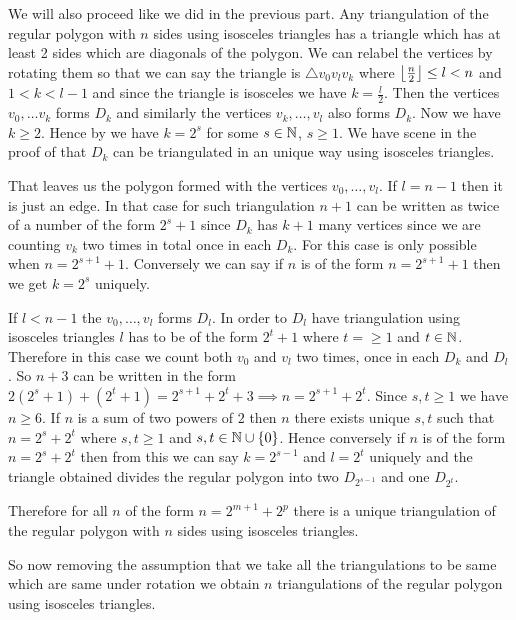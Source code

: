 \documentclass[a4paper, 11pt]{article}
\begin{document}
{\begin{itemize}[label=$\bullet$]
\begin{itemize}
We will also proceed like we did in the previous part. Any triangulation of the regular polygon with $n$ sides using isosceles triangles has a triangle which has at least 2 sides which are diagonals of the polygon. We can relabel the vertices by rotating them so that we can say the triangle is $\triangle v_0v_lv_k$ where $\left\lfloor\frac{n}2\right\rfloor\leq l<n$ and $1<k<l-1$ and since the triangle is isosceles we have $k=\frac{l}2$. Then the vertices $v_0,\dots  v_k$ forms $D_{k}$ and similarly the vertices  $v_k,\dots, v_l$ also forms $D_k$. Now we have $k\geq 2$. Hence by  we have $k=2^s$ for some $s\in\mathbb{N}$, $s\geq 1$. We have scene in the proof of  that $D_k$ can be triangulated in an unique way using isosceles triangles.  

That leaves us the polygon formed with the vertices $v_0,\dots, v_l$. If $l=n-1$ then it is just an edge. In that case for such triangulation $n+1$ can be written as twice of a number of the form $2^s+1$ since $D_k$ has $k+1$ many vertices since we are counting $v_k$ two times in total once in each $D_k$. For this case is only possible when $n=2^{s+1}+1$. Conversely we can say if $n$ is of the form $n=2^{s+1}+1$ then we get $k=2^s$ uniquely. 

If $l<n-1$ the $v_0,\dots, v_l$ forms $D_l$. In order to $D_l$ have triangulation using isosceles triangles $l$ has to be of the form $2^t+1$ where $t=\geq 1$ and $t\in\mathbb{N}$. Therefore in this case we count both $v_0$ and $v_l$ two times, once in each $D_k$ and $D_l$. So $n+3$ can be written in the form $2(2^s+1)+(2^t+1)=2^{s+1}+2^t +3\implies n=2^{s+1}+2^t$. Since $s,t\geq 1$ we have $n\geq 6$.  If $n$ is a sum of two powers of $2$ then $n$ there exists unique $s,t$ such that $n=2^s+2^t$ where $s,t\geq 1$ and $s,t\in\mathbb{N}\cup\{0\}$. Hence conversely if $n$ is of the form $n=2^s+2^t$ then from this we can say $k=2^{s-1}$ and $l=2^t$ uniquely and the triangle obtained divides the regular polygon into two $D_{2^{s-1}}$ and one $D_{2^t}$. 

Therefore for all $n$ of the form $n=2^{m+1}+2^p$ there is a unique triangulation of the regular polygon with $n$ sides using isosceles triangles.

So now removing the assumption that we take all the triangulations to be same which are same under rotation we obtain $n$ triangulations of the regular polygon using isosceles triangles. 
\end{itemize}
\end{itemize}
}
\end{document}

